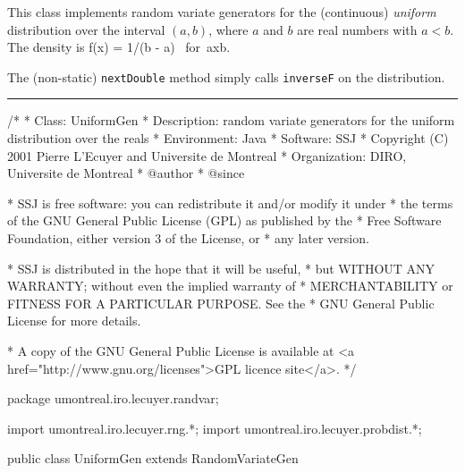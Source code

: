 
This class implements random variate generators for
the (continuous) {\em uniform\/} distribution over the interval $(a,b)$,
where $a$ and $b$ are real numbers with $a < b$.
The density is 
\eq
  f(x) = 1/(b - a) \qquad\mbox{ for }a\le x\le b.
\endeq

The (non-static) \texttt{nextDouble} method simply calls \texttt{inverseF} on the
distribution.

\bigskip\hrule

\begin{code}
\begin{hide}
/*
 * Class:        UniformGen
 * Description:  random variate generators for the uniform distribution over the reals
 * Environment:  Java
 * Software:     SSJ 
 * Copyright (C) 2001  Pierre L'Ecuyer and Universite de Montreal
 * Organization: DIRO, Universite de Montreal
 * @author       
 * @since

 * SSJ is free software: you can redistribute it and/or modify it under
 * the terms of the GNU General Public License (GPL) as published by the
 * Free Software Foundation, either version 3 of the License, or
 * any later version.

 * SSJ is distributed in the hope that it will be useful,
 * but WITHOUT ANY WARRANTY; without even the implied warranty of
 * MERCHANTABILITY or FITNESS FOR A PARTICULAR PURPOSE.  See the
 * GNU General Public License for more details.

 * A copy of the GNU General Public License is available at
   <a href="http://www.gnu.org/licenses">GPL licence site</a>.
 */
\end{hide}
package umontreal.iro.lecuyer.randvar;\begin{hide}
import umontreal.iro.lecuyer.rng.*;
import umontreal.iro.lecuyer.probdist.*;
\end{hide}

public class UniformGen extends RandomVariateGen \begin{hide} {
   private double a;
   private double b;
\end{hide}\end{code}


